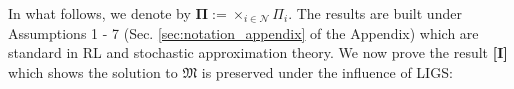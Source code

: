 \documentclass{article}
\newtheorem{definition}{Definition}
\begin{document}
% 
In what follows, we denote by $\boldsymbol{\Pi}:=\times_{i\in\mathcal{N}}\Pi_i$. The results are built under Assumptions 1 - 7 (Sec. \ref{sec:notation_appendix} of the Appendix) which are standard in RL and stochastic approximation theory.
% 
We now prove the result \textbf{[I]} which shows the solution to $\mathfrak{M}$ is preserved under the influence of LIGS: 
\end{document}
